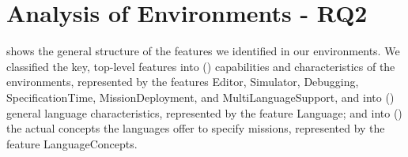 \newcommand{\f}[1]{\textsf{#1}\xspace}

\newcommand{\flanguage}{\f{Language}}

\newcommand{\feditor}{\f{Editor}}
\newcommand{\fsimulator}{\f{Simulator}}
\newcommand{\fdebugging}{\f{Debugging}}
\newcommand{\fspectime}{\f{SpecificationTime}}
\newcommand{\fdeployment}{\f{MissionDeployment}}
\newcommand{\fmultilang}{\f{MultiLanguageSupport}}


\newcommand{\fsemantics}{\f{Semantics}}
\newcommand{\fnotation}{\f{Notation}}
\newcommand{\flangparadigm}{\f{LanguageParadigm}}
\newcommand{\fextensibility}{\f{Extensibility}}

\newcommand{\flangconcepts}{\f{LanguageConcepts}}


\newcommand{\fflowchart}{\f{FlowChart}}
\newcommand{\fblockly}{\f{Blockly}}


\section{Analysis of Environments - RQ2}

 shows the general structure of the features we identified in our environments. 
We classified the key, top-level features into () capabilities and characteristics of the environments, represented by the features \feditor, \fsimulator, \fdebugging, \fspectime, \fdeployment, and \fmultilang, and into () general language characteristics, represented by the feature \flanguage; and into () the actual concepts the languages offer to specify missions, represented by the feature \flangconcepts.



	


